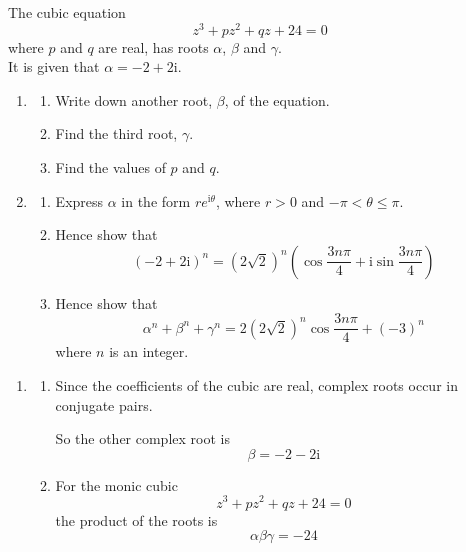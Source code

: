 \documentclass[leqno]{article}
\begin{document}
\begin{enumerate}[
  label=\textbf{\arabic*.},
  leftmargin=*,
  topsep=0pt,
  partopsep=0pt,
  parsep=0pt
]
The cubic equation
\[
z^3+pz^2+qz+24=0
\]
where $p$ and $q$ are real, has roots $\alpha$, $\beta$ and $\gamma$. \\
It is given that $\alpha=-2+2\mathrm{i}$. \\
\begin{enumerate}[label=\textbf{(\alph*)}]
  \item
  \begin{enumerate}[label=(\roman*)]
    \item Write down another root, $\beta$, of the equation. 
    \item Find the third root, $\gamma$. 
    \item Find the values of $p$ and $q$.  \\
  \end{enumerate}
  \item
  \begin{enumerate}[label=(\roman*)]
    \item Express $\alpha$ in the form $re^{\mathrm{i}\theta}$, where $r>0$ and $-\pi<\theta\leq \pi$. 
    \item Hence show that
    \[
    (-2+2\mathrm{i})^n=(2\sqrt{2})^n\left(\cos \frac{3n\pi}{4}+\mathrm{i}\sin \frac{3n\pi}{4}\right)
    \]
    \item Hence show that
    \[
    \alpha^n+\beta^n+\gamma^n=2(2\sqrt{2})^n\cos \frac{3n\pi}{4}+(-3)^n
    \]
    where $n$ is an integer. 
  \end{enumerate}
\end{enumerate}

\vspace*{30pt}

\begin{tcolorbox}[colback=white, colframe=scarlet, title={\textbf{Solution}}, breakable, grow to left by=6mm, grow to right by=10mm]
\begin{enumerate}[label=\textbf{(\alph*)}]
  \item
  \begin{enumerate}[label=(\roman*)]
    \item Since the coefficients of the cubic are real, complex roots occur in conjugate pairs.

    So the other complex root is
    \[
    \beta=-2-2\mathrm{i}
    \]

    \item For the monic cubic
    \[
    z^3+pz^2+qz+24=0
    \]
    the product of the roots is
    \[
    \alpha\beta\gamma=-24
    \]


\end{enumerate}
\end{enumerate}
\end{tcolorbox}
\end{enumerate}
\end{document}
